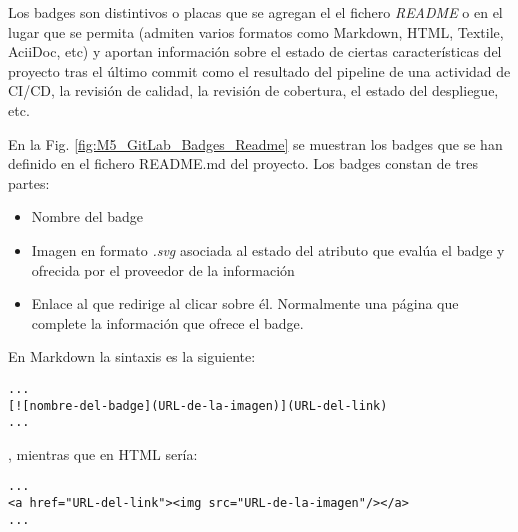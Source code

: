 Los badges son distintivos o placas que se agregan el el fichero \textit{README} o en el lugar que se permita (admiten varios formatos como Markdown, HTML, Textile, AciiDoc, etc) y aportan información sobre el estado de ciertas características del proyecto tras el último commit como el resultado del pipeline de una actividad de CI/CD, la revisión de calidad, la revisión de cobertura, el estado del despliegue, etc.

En la Fig. \ref{fig:M5_GitLab_Badges_Readme} se muestran los badges que se han definido en el fichero README.md del proyecto. Los badges constan de tres partes:
\begin{itemize}
	\tightlist
	\item Nombre del badge
	\item Imagen en formato \textit{.svg} asociada al estado del atributo que evalúa el badge y ofrecida por el proveedor de la información
	\item Enlace al que redirige al clicar sobre él. Normalmente una página que complete la información que ofrece el badge.
\end{itemize}
En Markdown la sintaxis es la siguiente:

\begin{minipage}{\linewidth}
{\tiny
\begin{lstlisting}[breaklines]
...
[![nombre-del-badge](URL-de-la-imagen)](URL-del-link)
...		
\end{lstlisting}
}
\end{minipage}
, mientras que en HTML sería:

\begin{minipage}{\linewidth}
{\tiny
\begin{lstlisting}[breaklines]
...
<a href="URL-del-link"><img src="URL-de-la-imagen"/></a>
...		
\end{lstlisting}
}
\end{minipage}


